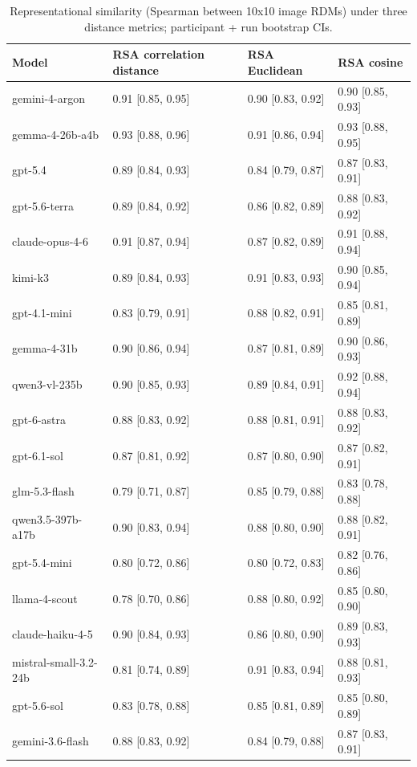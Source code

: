 \begin{table}
\caption{Representational similarity (Spearman between 10x10 image RDMs) under three distance metrics; participant + run bootstrap CIs.}
\begin{tabular}{llll}
\toprule
Model & RSA correlation distance & RSA Euclidean & RSA cosine \\
\midrule
gemini-4-argon & 0.91 [0.85, 0.95] & 0.90 [0.83, 0.92] & 0.90 [0.85, 0.93] \\
gemma-4-26b-a4b & 0.93 [0.88, 0.96] & 0.91 [0.86, 0.94] & 0.93 [0.88, 0.95] \\
gpt-5.4 & 0.89 [0.84, 0.93] & 0.84 [0.79, 0.87] & 0.87 [0.83, 0.91] \\
gpt-5.6-terra & 0.89 [0.84, 0.92] & 0.86 [0.82, 0.89] & 0.88 [0.83, 0.92] \\
claude-opus-4-6 & 0.91 [0.87, 0.94] & 0.87 [0.82, 0.89] & 0.91 [0.88, 0.94] \\
kimi-k3 & 0.89 [0.84, 0.93] & 0.91 [0.83, 0.93] & 0.90 [0.85, 0.94] \\
gpt-4.1-mini & 0.83 [0.79, 0.91] & 0.88 [0.82, 0.91] & 0.85 [0.81, 0.89] \\
gemma-4-31b & 0.90 [0.86, 0.94] & 0.87 [0.81, 0.89] & 0.90 [0.86, 0.93] \\
qwen3-vl-235b & 0.90 [0.85, 0.93] & 0.89 [0.84, 0.91] & 0.92 [0.88, 0.94] \\
gpt-6-astra & 0.88 [0.83, 0.92] & 0.88 [0.81, 0.91] & 0.88 [0.83, 0.92] \\
gpt-6.1-sol & 0.87 [0.81, 0.92] & 0.87 [0.80, 0.90] & 0.87 [0.82, 0.91] \\
glm-5.3-flash & 0.79 [0.71, 0.87] & 0.85 [0.79, 0.88] & 0.83 [0.78, 0.88] \\
qwen3.5-397b-a17b & 0.90 [0.83, 0.94] & 0.88 [0.80, 0.90] & 0.88 [0.82, 0.91] \\
gpt-5.4-mini & 0.80 [0.72, 0.86] & 0.80 [0.72, 0.83] & 0.82 [0.76, 0.86] \\
llama-4-scout & 0.78 [0.70, 0.86] & 0.88 [0.80, 0.92] & 0.85 [0.80, 0.90] \\
claude-haiku-4-5 & 0.90 [0.84, 0.93] & 0.86 [0.80, 0.90] & 0.89 [0.83, 0.93] \\
mistral-small-3.2-24b & 0.81 [0.74, 0.89] & 0.91 [0.83, 0.94] & 0.88 [0.81, 0.93] \\
gpt-5.6-sol & 0.83 [0.78, 0.88] & 0.85 [0.81, 0.89] & 0.85 [0.80, 0.89] \\
gemini-3.6-flash & 0.88 [0.83, 0.92] & 0.84 [0.79, 0.88] & 0.87 [0.83, 0.91] \\

\end{tabular}
\end{table}
